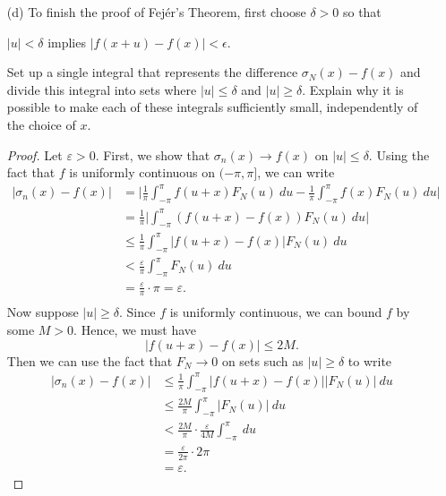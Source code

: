 \begin{enumerate}
\begin{proof}
        Hence, we have 
        \[  \int_{ -\pi  }^{ \pi  } F_{N}(u)  \ du = \pi. \]
        \end{proof}
    \item[(d)] To finish the proof of Fej\'{e}r's  Theorem, first choose \( \delta > 0  \) so that 
        \begin{center}
            \( | u  |  < \delta  \) implies \( |  f(x+u) - f(x)  | < \epsilon. \)
        \end{center}
        Set up a single integral that represents the difference \( \sigma_{N}(x) - f(x)  \) and divide this integral into sets where \( | u  |  \leq \delta  \) and \( |  u  |  \geq \delta  \). Explain why it is possible to make each of these integrals sufficiently small, independently of the choice of \( x  \).
        \begin{proof}
        Let \( \varepsilon > 0  \). First, we show that \( \sigma_{n}(x) \to f(x)  \) on \( | u  |  \leq \delta \). Using the fact that \( f  \) is uniformly continuous on \( (-\pi,\pi] \), we can write
        \begin{align*}
            | \sigma_{n}(x) - f(x) | &= \Big| \frac{ 1 }{ \pi  } \int_{ -\pi  }^{ \pi  } f(u+x) F_{N}(u)  \ du - \frac{ 1 }{ \pi  } \int_{ -\pi  }^{ \pi  } f(x) F_{N}(u)  \ du  \Big|  \\
                                     &= \frac{ 1 }{ \pi  } \Big| \int_{ -\pi  }^{ \pi  } (f(u+x) - f(x)) F_{N}(u)  \ du \Big| \\
                                     &\leq \frac{ 1 }{ \pi  } \int_{ -\pi }^{ \pi  } | f(u+x) - f(x)  | F_{N}(u)  \ du \\
                                     &< \frac{ \varepsilon }{ \pi  } \int_{ -\pi }^{ \pi  } F_{N}(u)  \ du \\ 
                                     &=  \frac{ \varepsilon }{ \pi }  \cdot \pi = \varepsilon. \\
        \end{align*}
        Now suppose \( | u  | \geq \delta \). Since \( f \) is uniformly continuous, we can bound \( f  \) by some \( M > 0  \). Hence, we must have 
        \[  | f(u+x) - f(x) | \leq 2M. \] 
        Then we can use the fact that \( F_{N} \to 0  \) on sets such as \( | u  |  \geq \delta \) to write 
        \begin{align*}
           | \sigma_{n}(x) - f(x) |  &\leq \frac{ 1 }{ \pi  } \int_{ -\pi  }^{ \pi  } | f(u+x) - f(x) | |F_{N}(u) | \ du \\
                                     &\leq \frac{ 2M }{ \pi  } \int_{ -\pi }^{ \pi } | F_{N}(u) |   \ du \\
                                     &< \frac{ 2M    }{ \pi  } \cdot \frac{ \varepsilon }{ 4M  }  \int_{ -\pi  }^{ \pi  }   \ du \\
                                     &= \frac{ \varepsilon }{ 2\pi  } \cdot 2\pi \\ 
                                     &= \varepsilon. 
        \end{align*}
        \end{proof}
\end{enumerate}

